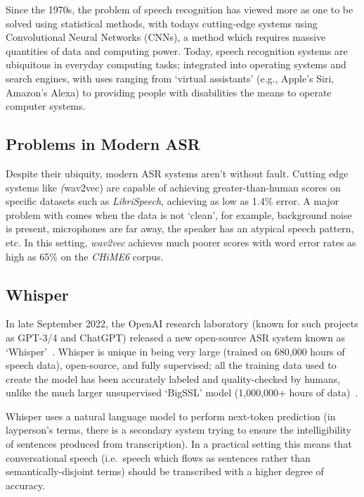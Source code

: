 Since the 1970s, the problem of speech recognition has viewed more as one to be solved using statistical methods\cite{early-asr,Rabiner2004Jan,LevinsonS.E.1983Aitt}, with todays cutting-edge systems using Convolutional Neural Networks (CNNs)\cite{whisper,wav2vec2,bigssl,chung2021}, a method which requires massive quantities of data and computing power.
Today, speech recognition systems are ubiquitous in everyday computing tasks; 
integrated into operating systems and search engines, with uses ranging from `virtual assistants' (e.g., Apple's Siri, Amazon's Alexa) to providing people with disabilities the means to operate computer systems.

\subsection{Problems in Modern ASR}

Despite their ubiquity, modern ASR systems aren't without fault.
Cutting edge systems like \emph(wav2vec) are capable of achieving greater-than-human scores on specific datasets\cite{wav2vec2,bigssl,chung2021} such as \emph{LibriSpeech}\cite{librispeech}, achieving as low as 1.4\% error\cite{zhang2020}.
A major problem with comes when the data is not `clean', for example, background noise is present, microphones are far away, the speaker has an atypical speech pattern, etc. 
In this setting, \emph{wav2vec} achieves much poorer scores with word error rates as high as 65\%\cite{whisper} on the \emph{CHiME6} corpus\cite{chime6}.

\subsection{Whisper}

In late September 2022, the OpenAI research laboratory (known for such projects as GPT-3/4 and ChatGPT) released a new open-source ASR system known as `Whisper'~\cite{whisper}.
Whisper is unique in being very large (trained on 680,000 hours of speech data), open-source, and fully supervised;
all the training data used to create the model has been accurately labeled and
quality-checked by humans, unlike the much larger unsupervised `BigSSL' model (1,000,000+ hours of data)~\cite{bigssl}.

Whisper uses a natural language model to perform next-token prediction (in layperson's terms, there is a secondary system trying to ensure the intelligibility of sentences produced from transcription).
In a practical setting this means that conversational speech (i.e.\ speech which flows as sentences rather than semantically-disjoint terms) should be transcribed with a higher degree of accuracy.

